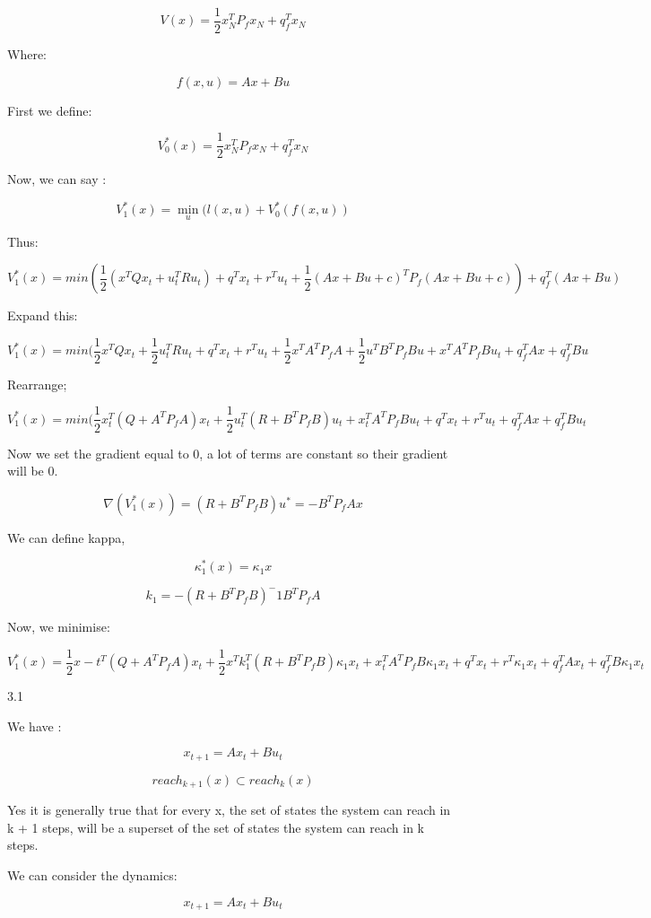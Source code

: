 \documentclass{article}
\begin{document}
\[ V(x) = \frac{1}{2} x_N^T P_f  x_N + q_f^Tx_N \] 

Where:
 
\[ f(x, u) = Ax + Bu \]


First we define:

\[ V_0^* (x) = \frac{1}{2} x_N^T P_f x_N + q_f^T x_N \]

Now, we can say : 

\[ V_1^* (x) = \min_u(l(x, u) + V_0^*(f(x, u)) \]

Thus:


\[  V_1^* (x) = min(\frac{1}{2}(x^T Q x_t + u_t^T R u_t) + q^T x_t + r^T u_t + \frac{1}{2} (Ax + Bu + c)^T P_f (Ax + Bu + c)) + q_f^T(Ax + Bu) \] 


Expand this:


\[  V_1^* (x) = min(\frac{1}{2} x^T Q x_t + \frac{1}{2} u_t^T R u_t + q^Tx_t + r^T u_t + \frac{1}{2} x^T A^TP_f A + \frac{1}{2} u^TB^TP_fBu + x^TA^TP_fBu_t + q_f^T A x + q_f^T Bu \]

Rearrange;

\[  V_1^* (x) = min(\frac{1}{2} x_t^T(Q + A^T P_f A) x_t + \frac{1}{2} u_t^T(R + B^T P_f B) u_t + x_t^T A^T P_f B u_t + q^T x_t + r^T u_t + q_f^T A x + q_f^T B u_t \]

Now we set the gradient equal to 0, a lot of terms are constant so their gradient will be 0.

\[ \nabla (V_1^* (x)) = (R + B^T P_f B) u^*  = -B^T P_f A x  \] 


We can define kappa, 

\[ \kappa_1^* (x) = \kappa_1 x \] 

\[ k_1 = -(R + B^T P_f B)^-1 B^T P_f A \]

Now, we minimise:

\[ V_1^* (x) = \frac{1}{2} x-t^T(Q + A^T P_f A) x_t + \frac{1}{2} x^T k_1^T (R + B^T P_f B) \kappa_1 x_t  + x_t^T A^T P_f B \kappa_1 x_t + q^T x_t + r^T \kappa_1 x_t + q_f^T A x_t + q_f^T B \kappa_1x_t \]

3.1

We have :

\[ x_{t+1} = Ax_t + Bu_t \] 

\[ reach_{k+1} (x) \subset reach_k (x) \] 

Yes it is generally true that for every x, the set of states the system can reach in k + 1 steps, will be a superset of the set of states the system can reach in k steps. 

We can consider the dynamics:

\[ x_{t+1} = Ax_t + Bu_t \] 
\end{document}
